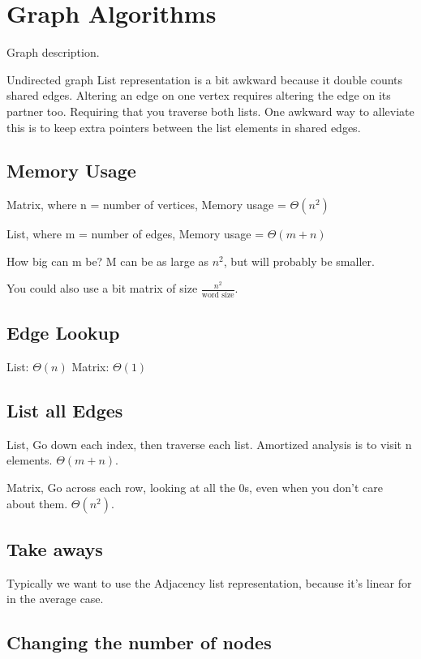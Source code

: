 \documentclass[english, 10pt]{article}
\begin{document}
\section{Graph Algorithms}

Graph description.

Undirected graph List representation is a bit awkward because it double counts
shared edges. Altering an edge on one vertex requires altering the edge on its
partner too. Requiring that you traverse both lists. One awkward way to
alleviate this is to keep extra pointers between the list elements in shared
edges.

\subsection{Memory Usage}

Matrix, where n = number of vertices, Memory usage = $\Theta(n^2)$

List, where m = number of edges, Memory usage = $\Theta(m+n)$

How big can m be? M can be as large as $n^2$, but will probably be smaller.

You could also use a bit matrix of size $\frac{n^2}{\text{word size}}$.

\subsection{Edge Lookup}
List: $\Theta(n)$
Matrix: $\Theta(1)$

\subsection{List all Edges}

List, Go down each index, then traverse each list. Amortized analysis is to
visit n elements. $\Theta(m+n)$.

Matrix, Go across each row, looking at all the 0s, even when you don't care
about them. $\Theta(n^2)$.

\subsection{Take aways}

Typically we want to use the Adjacency list representation, because it's linear
for in the average case.

\subsection{Changing the number of nodes }
\end{document}
